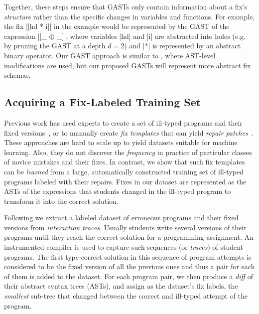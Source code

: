 Together, these steps ensure that GASTs only contain information about a fix's
\emph{structure} rather than the specific changes in variables and functions.
%
For example, the fix |[hd * i]| in the \mbd example would be represented by the
GAST of the expression |[_ $\oplus$ _]|, where variables |hd| and |i| are
abstracted into holes (e.g. by pruning the GAST at a depth $d=2$) and |*| is
represented by an abstract binary operator. Our GAST approach is similar to
\citep{Lerner2007-dt}, where AST-level modifications are used, but our proposed
GASTs will represent more abstract fix schemas.


\subsection{Acquiring a Fix-Labeled Training Set}
\label{sec:overview:data}

Previous work has used experts to create a set of ill-typed programs and their
fixed versions~\citep[][]{Lerner2007-dt, Loncaric2016-uk}, or to manually create
\emph{fix templates} that can yield \emph{repair
patches}~\citep[][]{martinez2013automatically,martinez2015mining}.
%
These approaches are hard to scale up to yield datasets suitable for machine
learning. Also, they do not discover the \emph{frequency} in practice of particular
classes of novice mistakes and their fixes.
%
In contrast, we show that such fix templates can be \emph{learned} from a large,
automatically constructed training set of ill-typed programs labeled with their
repairs.
%
Fixes in our dataset are represented as the ASTs of the expressions that students
changed in the ill-typed program to transform it into the correct solution.

Following \citep{Seidel:2017} we extract a labeled dataset of erroneous programs
and their fixed versions from \emph{interaction traces}. Usually students write
several versions of their programs until they reach the correct solution for a
programming assignment. An instrumented compiler is used to capture such
sequences (or \emph{traces}) of student programs. The first type-correct
solution in this sequence of program attempts is considered to be the fixed
version of all the previous ones and thus a pair for each of them is added to
the dataset. For each program pair, we then produce a \emph{diff} of their
abstract syntax trees (ASTs), and assign as the dataset's fix labels, the
\emph{smallest} sub-tree that changed between the correct and ill-typed attempt
of the program.


